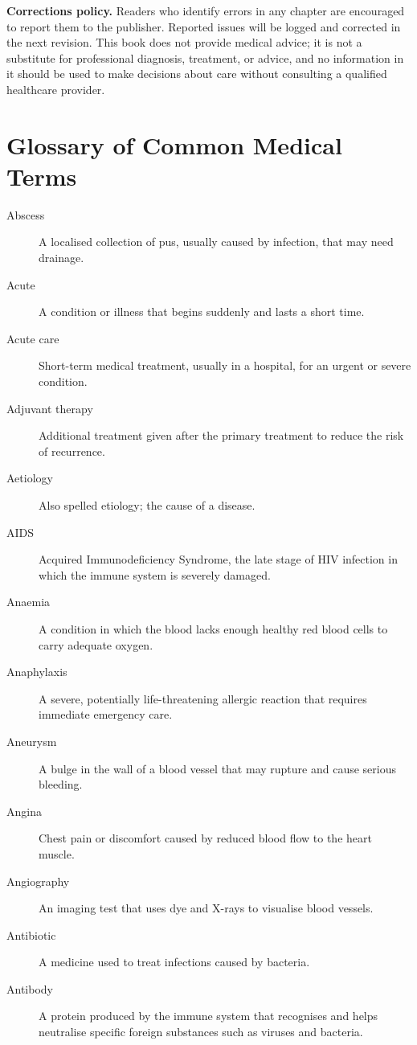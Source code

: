 \documentclass[12pt,oneside]{book}
\begin{document}
\medskip
\noindent\textbf{Corrections policy.} Readers who identify errors in any chapter are encouraged to report them to the publisher. Reported issues will be logged and corrected in the next revision. This book does not provide medical advice; it is not a substitute for professional diagnosis, treatment, or advice, and no information in it should be used to make decisions about care without consulting a qualified healthcare provider.

\section*{Glossary of Common Medical Terms}

\begin{description}
  \item[Abscess] A localised collection of pus, usually caused by infection, that may need drainage.
  \item[Acute] A condition or illness that begins suddenly and lasts a short time.
  \item[Acute care] Short-term medical treatment, usually in a hospital, for an urgent or severe condition.
  \item[Adjuvant therapy] Additional treatment given after the primary treatment to reduce the risk of recurrence.
  \item[Aetiology] Also spelled etiology; the cause of a disease.
  \item[AIDS] Acquired Immunodeficiency Syndrome, the late stage of HIV infection in which the immune system is severely damaged.
  \item[Anaemia] A condition in which the blood lacks enough healthy red blood cells to carry adequate oxygen.
  \item[Anaphylaxis] A severe, potentially life-threatening allergic reaction that requires immediate emergency care.
  \item[Aneurysm] A bulge in the wall of a blood vessel that may rupture and cause serious bleeding.
  \item[Angina] Chest pain or discomfort caused by reduced blood flow to the heart muscle.
  \item[Angiography] An imaging test that uses dye and X-rays to visualise blood vessels.
  \item[Antibiotic] A medicine used to treat infections caused by bacteria.
  \item[Antibody] A protein produced by the immune system that recognises and helps neutralise specific foreign substances such as viruses and bacteria.

\end{description}
\end{document}
